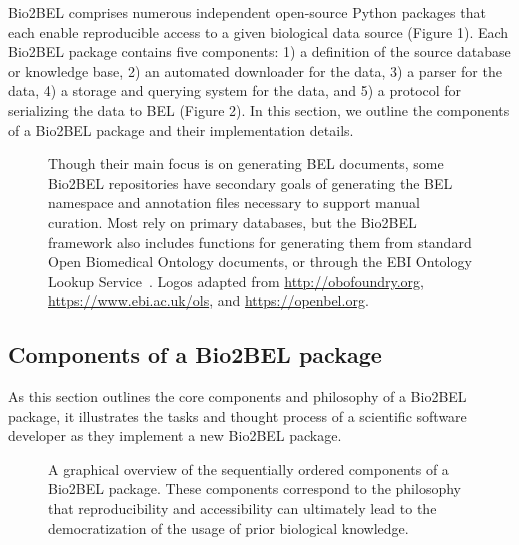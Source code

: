 Bio2BEL comprises numerous independent open-source Python packages that each enable reproducible access to a given biological data source (Figure 1).
Each Bio2BEL package contains five components: 1) a definition of the source database or knowledge base, 2) an automated downloader for the data, 3) a parser for the data, 4) a storage and querying system for the data, and 5) a protocol for serializing the data to BEL (Figure 2).
In this section, we outline the components of a Bio2BEL package and their implementation details.

\begin{figure}
    \caption[Schema of Bio2BEL]{Though their main focus is on generating BEL documents, some Bio2BEL repositories have secondary goals of generating the BEL namespace and annotation files necessary to support manual curation. Most rely on primary databases, but the Bio2BEL framework also includes functions for generating them from standard Open Biomedical Ontology documents, or through the EBI Ontology Lookup Service~\cite{Cote2006a}. Logos adapted from \url{http://obofoundry.org}, \url{https://www.ebi.ac.uk/ols}, and \url{https://openbel.org}.}
    \label{fig:schema}
\end{figure}


\subsection*{Components of a Bio2BEL package}

As this section outlines the core components and philosophy of a Bio2BEL package, it illustrates the tasks and thought process of a scientific software developer as they implement a new Bio2BEL package.

\begin{figure}
    \caption[Components of Bio2BEL]{A graphical overview of the sequentially ordered components of a Bio2BEL package. These components correspond to the philosophy that reproducibility and accessibility can ultimately lead to the democratization of the usage of prior biological knowledge.}
    \label{fig:components}
\end{figure}

